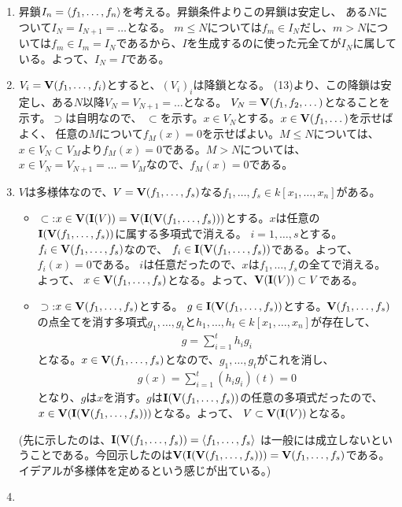 \documentclass[9pt]{ltjsarticle}
\begin{document}
\begin{enumerate}[label=(問題\arabic*)]
\item 昇鎖$I_n = \left\langle f_1,\dots,f_n \right\rangle$を考える。昇鎖条件よりこの昇鎖は安定し、
ある$N$について$I_N = I_{N+1} = \dots$となる。
$m \le N$については$f_m \in I_N$だし、$m> N$については$f_m \in I_m = I_N$であるから、$I$を生成するのに使った元全てが$I_N$に属している。よって、$I_N = I$である。
\item $V_i = \textbf V(f_1,\dots,f_i)$とすると、$(V_i)_i$は降鎖となる。
(13)より、この降鎖は安定し、ある$N$以降$V_N = V_{N+1} = \dots$となる。
$V_N = \textbf V(f_1,f_2,\dots)$となることを示す。$\supset$は自明なので、
$\subset$を示す。$x\in V_N$とする。$x \in \textbf V(f_1,\dots)$を示せばよく、
任意の$M$について$f_M(x)=0$を示せばよい。$M\le N$については、
$x\in V_N \subset V_M$より$f_M(x)=0$である。$M > N$については、
$x \in V_N = V_{N+1} = \dots = V_M$なので、$f_M(x)=0$である。
\item
$V$は多様体なので、$V=\textbf V(f_1,\dots,f_s)$なる$f_1,\dots,f_s \in k[x_1,\dots,x_n]$がある。
\begin{itemize}
  \item $\subset$:$x\in \textbf V(\textbf I(V)) = \textbf V(\textbf I(\textbf V(f_1,\dots,f_s)))$とする。$x$は任意の$\textbf I(\textbf V(f_1,\dots,f_s))$に属する多項式で消える。
  $i=1,\dots,s$とする。$f_i \in \textbf V(f_1,\dots,f_s)$なので、
  $f_i \in \textbf I(\textbf V(f_1,\dots,f_s))$である。よって、$f_i(x)=0$である。
  $i$は任意だったので、$x$は$f_1,\dots,f_s$の全てで消える。よって、
  $x\in \textbf V(f_1,\dots,f_s)$となる。よって、$\textbf V(\textbf I(V)) \subset V$である。
  \item $\supset$:$x\in \textbf V(f_1,\dots,f_s)$とする。
  $g\in \textbf I(\textbf V(f_1,\dots,f_s))$とする。$\textbf V(f_1,\dots,f_s)$の点全てを消す多項式$g_1,\dots,g_t$と$h_1,\dots,h_t \in k[x_1,\dots,x_n]$が存在して、
  \begin{align}
    g = \sum_{i=1}^t h_i g_i
  \end{align}
  となる。$x\in \textbf V(f_1,\dots,f_s)$となので、$g_1,\dots,g_t$がこれを消し、
  \begin{align}
    g(x) = \sum_{i=1}^t (h_i g_i)(t) = 0
  \end{align}
  となり、$g$は$x$を消す。$g$は$\textbf I(\textbf V(f_1,\dots,f_s))$の任意の多項式だったので、$x\in \textbf V(\textbf I(\textbf V(f_1,\dots,f_s)))$となる。よって、
  $V\subset \textbf V(\textbf I(V))$となる。
  \end{itemize}
  (先に示したのは、$\textbf I(\textbf V(f_1,\dots,f_s)) = \left\langle f_1,\dots,f_s \right\rangle$
  は一般には成立しないということである。今回示したのは$\textbf V(\textbf I(\textbf V(f_1,\dots,f_s)))=\textbf V(f_1,\dots,f_s)$である。イデアルが多様体を定めるという感じが出ている。)
  \item

\end{enumerate}
\end{document}
